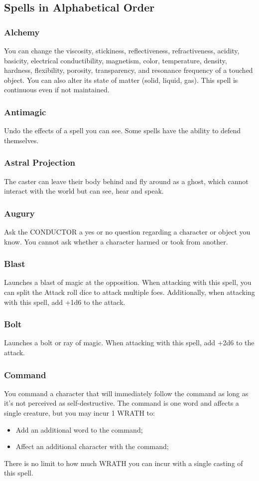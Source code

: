 \subsection{Spells in Alphabetical Order}
\begin{multicols}{3}
\subsubsection*{Alchemy}
You can change the viscosity, stickiness, reflectiveness, refractiveness, acidity, basicity, electrical conductibility, magnetism, color, temperature, density, hardness, flexibility, porosity, transparency, and resonance frequency of a touched object. You can also alter its state of matter (solid, liquid, gas). This spell is continuous even if not maintained.
\subsubsection*{Antimagic}
Undo the effects of a spell you can see. Some spells have the ability to defend themselves.
\subsubsection*{Astral Projection}
The caster can leave their body behind and fly around as a ghost, which cannot interact with the world but can see, hear and speak.
\subsubsection*{Augury}
Ask the CONDUCTOR a yes or no question regarding a character or object you know. You cannot ask whether a character harmed or took from another.
\subsubsection*{Blast}
Launches a blast of magic at the opposition. When attacking with this spell, you can split the Attack roll dice to attack multiple foes. Additionally, when attacking with this spell, add +1d6 to the attack.
\subsubsection*{Bolt}
Launches a bolt or ray of magic. When attacking with this spell, add +2d6 to the attack.
\subsubsection*{Command}
You command a character that will immediately follow the command as long as it's not perceived as self-destructive. The command is one word and affects a single creature, but you may incur 1 WRATH to:
\begin{itemize}
    \item {Add an additional word to the command;}
    \item {Affect an additional character with the command;}
\end{itemize}
There is no limit to how much WRATH you can incur with a single casting of this spell.

\end{multicols}
